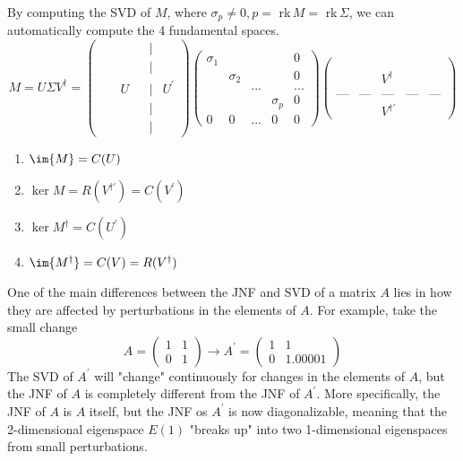   By computing the SVD of $M$, where $\sigma_p \neq 0, p =$ rk$\,M = $ rk$\,\Sigma$, we can automatically compute the 4 fundamental spaces. 
  \[M = U \Sigma V^\dagger = \begin{pmatrix}&&&&|&\\&&&&|&\\&&U&&|&U^\prime\\&&&&|&\\&&&&|&
  \end{pmatrix} \begin{pmatrix}
  \sigma_1&&&&0\\
  &\sigma_2&&&0\\
  &&...&&...\\
  &&&\sigma_p&0\\
  0&0&...&0&0
  \end{pmatrix}\begin{pmatrix}
  &&&&\\&&&&\\&&V^\dagger&&\\&&&&\\\text{---}&\text{---}&\text{---}&\text{---}&\text{---}
  \\&&V^{\dagger \prime}&&
  \end{pmatrix}\]
  \begin{enumerate}
      \item $\im{M} = C(U)$
      \item $\ker{M} = R(V^{\dagger \prime}) = C(V^\prime)$
      \item $\ker{M^\dagger} = C(U^\prime)$
      \item $\im{M^\dagger} = C(V) = R(V^\dagger)$
  \end{enumerate}

  One of the main differences between the JNF and SVD of a matrix $A$ lies in how they are affected by perturbations in the elements of $A$. For example, take the small change 
  \[ A = \begin{pmatrix}
  1 & 1\\
  0 & 1
  \end{pmatrix} \longrightarrow A^\prime  = \begin{pmatrix}
  1 & 1 \\
  0 & 1.00001
  \end{pmatrix}\]
  The SVD of $A^\prime$ will "change" continuously for changes in the elements of $A$, but the JNF of $A$ is completely different from the JNF of $A^\prime$. More specifically, the JNF of $A$ is $A$ itself, but the JNF os $A^\prime$ is now diagonalizable, meaning that the 2-dimensional eigenspace $E(1)$ "breaks up" into two 1-dimensional eigenspaces from small perturbations. 

